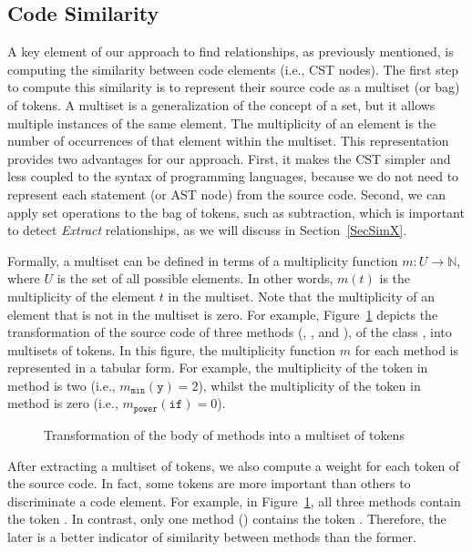 \subsection{Code Similarity}
\label{SecCodeSim}



A key element of our approach to find relationships, as previously mentioned, is computing the similarity between code elements (i.e., CST nodes).
The first step to compute this similarity is to represent their source code as a multiset (or bag) of tokens.
A multiset is a generalization of the concept of a set, but it allows multiple instances of the same element.
The multiplicity of an element is the number of occurrences of that element within the multiset.
This representation provides two advantages for our approach.
First, it makes the CST simpler and less coupled to the syntax of programming languages, because we do not need to represent each statement (or AST node) from the source code. Second, we can apply set operations to the bag of tokens, such as subtraction, which is important to detect \emph{Extract} relationships, as we will discuss in Section~\ref{SecSimX}.

Formally, a multiset can be defined in terms of a multiplicity function $m: U \to \mathbb{N}$, where $U$ is the set of all possible elements. In other words, $m(t)$ is the multiplicity of the element $t$ in the multiset. Note that the multiplicity of an element that is not in the multiset is zero.
For example, Figure~\ref{FigSourceCodeTransformation} depicts the transformation of the source code of three methods (, , and ), of the class , into multisets of tokens. In this figure, the multiplicity function $m$ for each method is represented in a tabular form. For example, the multiplicity of the token  in method  is two (i.e., $m_{\mathtt{min}}(\mathtt{y}) = 2$), whilst the multiplicity of the token  in method  is zero (i.e., $m_{\mathtt{power}}(\mathtt{if}) = 0$).

\begin{figure}[tbp]
\renewcommand{\arraystretch}{1.2}
\centering
\footnotesize
\resizebox{\columnwidth}{!}{%

}
\caption{Transformation of the body of methods into a multiset of tokens}
\label{FigSourceCodeTransformation}
\end{figure}

After extracting a multiset of tokens, we also compute a weight for each token
of the source code.
In fact, some tokens are more important than others to discriminate a code element.
For example, in Figure~\ref{FigSourceCodeTransformation}, all three methods contain the token . In contrast, only one method () contains the token . Therefore, the later is a better indicator of similarity between methods than the former.

